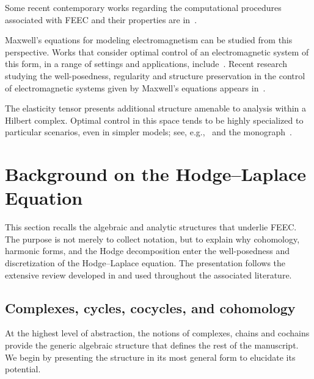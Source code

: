 \documentclass{article}
\begin{document}
Some recent contemporary works regarding the computational procedures associated with FEEC and their properties are in~\cite{li2020improved,licht2017complexes,gawlik2021local,licht2024symmetry}. 

Maxwell's equations for modeling electromagnetism can be studied from this perspective. Works that consider optimal control of an electromagnetic system of this form,
in a range of settings and applications, include~\cite{yousept2017optimal,yousept2012optimal,nicaise2017optimal,brizitskii2010inverse}. Recent research studying the well-posedness, regularity and structure preservation in the control of electromagnetic systems given by Maxwell's equations appears in~\cite{tran2022optimal,antil2026structure,arnold2010finite}.

The elasticity tensor presents additional structure amenable to analysis within a Hilbert complex.
Optimal control in this space tends to be highly specialized to particular scenarios, even in simpler models; see, e.g.,~\cite{schiela2020optimal} and the monograph~\cite{komkov2006optimal}.





%     

\section{Background on the Hodge--Laplace Equation}

This section recalls the algebraic and analytic structures that underlie FEEC.  The purpose is not merely to collect notation, but to
explain why cohomology, harmonic forms, and the Hodge decomposition enter the
well-posedness and discretization of the Hodge--Laplace equation.  The
presentation follows the extensive review developed in
\cite{BrLe92,arnold2010finite} and used throughout the associated literature.

\subsection{Complexes, cycles, cocycles, and cohomology}

At the highest level of abstraction, the notions of complexes, chains and cochains provide the generic algebraic structure that defines the rest of the manuscript. We begin by presenting the structure in its most general form to elucidate its potential. 
\end{document}
